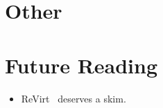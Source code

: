 \documentclass{article}
\begin{document}
\section{Other}

\section{Future Reading}
\begin{itemize}
	\item ReVirt~\cite{revirt} deserves a skim.
\end{itemize}

{}

\end{document}
